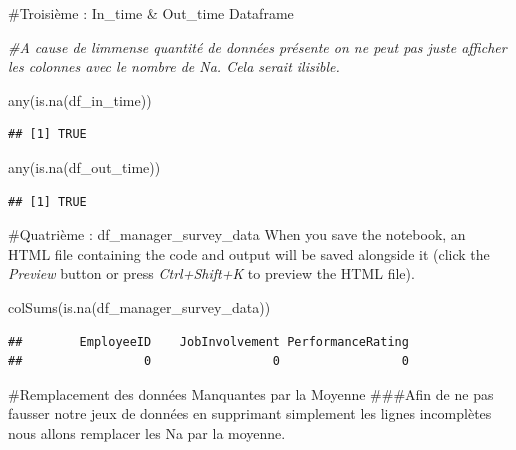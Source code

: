 \documentclass[
]{article}
\newenvironment{Shaded}{\begin{snugshade}}{\end{snugshade}}
\newcommand{\AttributeTok}[1]{\textcolor[rgb]{0.77,0.63,0.00}{#1}}
\newcommand{\CommentTok}[1]{\textcolor[rgb]{0.56,0.35,0.01}{\textit{#1}}}
\newcommand{\ConstantTok}[1]{\textcolor[rgb]{0.00,0.00,0.00}{#1}}
\newcommand{\FunctionTok}[1]{\textcolor[rgb]{0.00,0.00,0.00}{#1}}
\newcommand{\NormalTok}[1]{#1}
\newcommand{\OtherTok}[1]{\textcolor[rgb]{0.56,0.35,0.01}{#1}}
\newcommand{\SpecialCharTok}[1]{\textcolor[rgb]{0.00,0.00,0.00}{#1}}
\begin{document}
\#Troisième : In\_time \& Out\_time Dataframe

\begin{Shaded}
\begin{Highlighting}[]
\CommentTok{\#A cause de l\textquotesingle{}immense quantité de données présente on ne peut pas juste afficher les colonnes avec le nombre de Na. Cela serait ilisible. }

\FunctionTok{any}\NormalTok{(}\FunctionTok{is.na}\NormalTok{(df\_in\_time))}
\end{Highlighting}
\end{Shaded}

\begin{verbatim}
## [1] TRUE
\end{verbatim}

\begin{Shaded}
\begin{Highlighting}[]
\FunctionTok{any}\NormalTok{(}\FunctionTok{is.na}\NormalTok{(df\_out\_time))}
\end{Highlighting}
\end{Shaded}

\begin{verbatim}
## [1] TRUE
\end{verbatim}

\#Quatrième : df\_manager\_survey\_data When you save the notebook, an
HTML file containing the code and output will be saved alongside it
(click the \emph{Preview} button or press \emph{Ctrl+Shift+K} to preview
the HTML file).

\begin{Shaded}
\begin{Highlighting}[]
\FunctionTok{colSums}\NormalTok{(}\FunctionTok{is.na}\NormalTok{(df\_manager\_survey\_data))}
\end{Highlighting}
\end{Shaded}

\begin{verbatim}
##        EmployeeID    JobInvolvement PerformanceRating 
##                 0                 0                 0
\end{verbatim}

\#Remplacement des données Manquantes par la Moyenne \#\#\#Afin de ne
pas fausser notre jeux de données en supprimant simplement les lignes
incomplètes nous allons remplacer les Na par la moyenne.

\begin{Shaded}
\end{Shaded}
\end{document}
